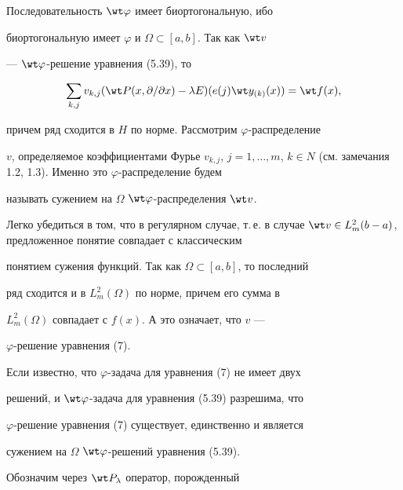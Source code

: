 \begin{pf} 


Последовательность $\wt\varphi$ имеет биортогональную, ибо 


биортогональную имеет $\varphi$ и $\Omega\subset[a,b]$. Так как $\wt v$ 


--- $\wt\varphi$-решение уравнения (5.39), то 


$$ 


\sum_{k,j}v_{k,j}(\wt P(x,\partial/\partial x)-\lambda E) 


(e(j)\wt y_{(k)}(x))=\wt f(x), 


$$ 


причем ряд сходится в $H$ по норме. Рассмотрим $\varphi$-распределение 


$v$, определяемое коэффициентами Фурье $v_{k,j}$, $j=1,\dotsc,m$, $k\in 


N$ (см. замечания 1.2, 1.3). Именно это $\varphi$-распределение будем 


называть сужением на $\Omega$\; $\wt\varphi$-распределения $\wt v$. 


Легко убедиться в том, что в регулярном случае, т.\,е. в случае $\wt 


v\in L^2_m(b-a)$, предложенное понятие совпадает с классическим 


понятием сужения функций. Так как $\Omega\subset[a,b]$, то последний 


ряд сходится и в $L^2_m(\Omega)$ по норме, причем его сумма в 


$L^2_m(\Omega)$ совпадает с $f(x)$. А это означает, что $v$ --- 


$\varphi$-решение уравнения (7). 


\end{pf} 


 


\begin{notes} 


Если известно, что $\varphi$-задача для уравнения (7) не имеет двух 


решений, и $\wt\varphi$-задача для уравнения (5.39) разрешима, что 


$\varphi$-решение уравнения (7) существует, единственно и является 


сужением на $\Omega$\; $\wt\varphi$-решений уравнения (5.39). 


\end{notes} 


Обозначим через $\wt P_\lambda$ оператор, порожденный 


